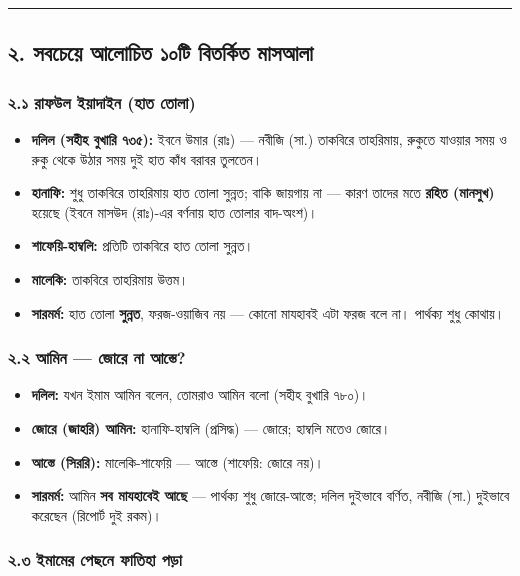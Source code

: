 \medskip\hrule\medskip

\subsection*{২. সবচেয়ে আলোচিত ১০টি বিতর্কিত মাসআলা}

\subsubsection*{২.১ রাফউল ইয়াদাইন (হাত তোলা)}

\begin{itemize}
\item \textbf{দলিল (সহীহ বুখারি ৭৩৫):} ইবনে উমার (রাঃ) — নবীজি (সা.) তাকবিরে তাহরিমায়, রুকুতে যাওয়ার সময় ও রুকু থেকে উঠার সময় দুই হাত কাঁধ বরাবর তুলতেন।
\item \textbf{হানাফি:} শুধু তাকবিরে তাহরিমায় হাত তোলা সুন্নত; বাকি জায়গায় না — কারণ তাদের মতে \textbf{রহিত (মানসুখ)} হয়েছে (ইবনে মাসউদ (রাঃ)-এর বর্ণনায় হাত তোলার বাদ-অংশ)।
\item \textbf{শাফেয়ি-হাম্বলি:} প্রতিটি তাকবিরে হাত তোলা সুন্নত।
\item \textbf{মালেকি:} তাকবিরে তাহরিমায় উত্তম।
\item \textbf{সারমর্ম:} হাত তোলা \textbf{সুন্নত}, ফরজ-ওয়াজিব নয় — কোনো মাযহাবই এটা ফরজ বলে না। পার্থক্য শুধু কোথায়।
\end{itemize}
\subsubsection*{২.২ আমিন — জোরে না আস্তে?}

\begin{itemize}
\item \textbf{দলিল:} যখন ইমাম আমিন বলেন, তোমরাও আমিন বলো (সহীহ বুখারি ৭৮০)।
\item \textbf{জোরে (জাহরি) আমিন:} হানাফি-হাম্বলি (প্রসিদ্ধ) — জোরে; হাম্বলি মতেও জোরে।
\item \textbf{আস্তে (সিররি):} মালেকি-শাফেয়ি — আস্তে (শাফেয়ি: জোরে নয়)।
\item \textbf{সারমর্ম:} আমিন \textbf{সব মাযহাবেই আছে} — পার্থক্য শুধু জোরে-আস্তে; দলিল দুইভাবে বর্ণিত, নবীজি (সা.) দুইভাবে করেছেন (রিপোর্ট দুই রকম)।
\end{itemize}
\subsubsection*{২.৩ ইমামের পেছনে ফাতিহা পড়া}

